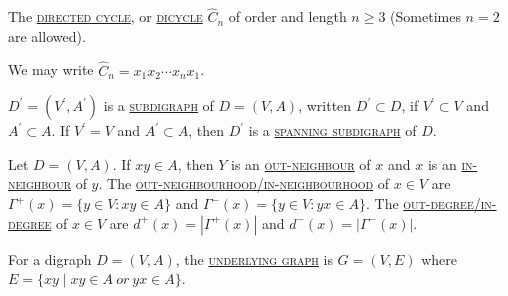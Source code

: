 \begin{example}
    The \uline{\textcolor{MarkerColour}{\textsc{directed cycle}}}, or \uline{\textcolor{MarkerColour}{\textsc{dicycle}}} $\hat{C}_n$ of order and length $n\geqslant 3$ (Sometimes $n=2$ are allowed).


We may write $\hat{C}_n = x_1x_2\cdots x_nx_1$. 
\end{example}

$D^{\prime} = (V^{\prime}, A^{\prime})$ is a \uline{\textcolor{MarkerColour}{\textsc{subdigraph}}} of $D = (V, A)$, written $D^{\prime}\subset D$, if $V^{\prime}\subset V$ and $A^{\prime} \subset A$. If $V^{\prime} = V$ and $A^{\prime}\subset A$, then $D^{\prime}$ is a \uline{\textcolor{MarkerColour}{\textsc{spanning subdigraph}}} of $D$.

Let $D = (V, A)$. If $xy\in A$, then $Y$ is an \uline{\textcolor{MarkerColour}{\textsc{out-neighbour}}} of $x$ and $x$ is an \uline{\textcolor{MarkerColour}{\textsc{in-neighbour}}} of $y$. The \uline{\textcolor{MarkerColour}{\textsc{out-neighbourhood/in-neighbourhood}}} of $x\in V$ are $\Gamma^{+}(x) = \{y\in V: xy\in A\}$ and $\Gamma^{-}(x) = \{y\in V: yx\in A\}$. The \uline{\textcolor{MarkerColour}{\textsc{out-degree/in-degree}}} of $x\in V$ are $d^+(x) = |\Gamma^+(x)|$ and $d^-(x) = |\Gamma^-(x)|$.

For a digraph $D = (V, A)$, the \uline{\textcolor{MarkerColour}{\textsc{underlying graph}}} is $G = (V, E)$ where $E = \{xy\mid xy\in A\ or\ yx\in A\}$.

